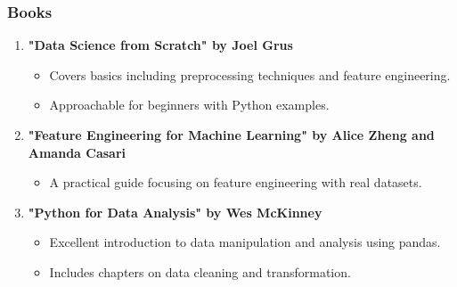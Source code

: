 \documentclass[aspectratio=169]{beamer}
\begin{document}
\begin{frame}
    \frametitle{Books}
    \begin{enumerate}
        \item \textbf{"Data Science from Scratch" by Joel Grus}
            \begin{itemize}
                \item Covers basics including preprocessing techniques and feature engineering.
                \item Approachable for beginners with Python examples.
            \end{itemize}
        \item \textbf{"Feature Engineering for Machine Learning" by Alice Zheng and Amanda Casari}
            \begin{itemize}
                \item A practical guide focusing on feature engineering with real datasets.
            \end{itemize}
        \item \textbf{"Python for Data Analysis" by Wes McKinney}
            \begin{itemize}
                \item Excellent introduction to data manipulation and analysis using pandas.
                \item Includes chapters on data cleaning and transformation.
            \end{itemize}
    \end{enumerate}
\end{frame}
\end{document}
